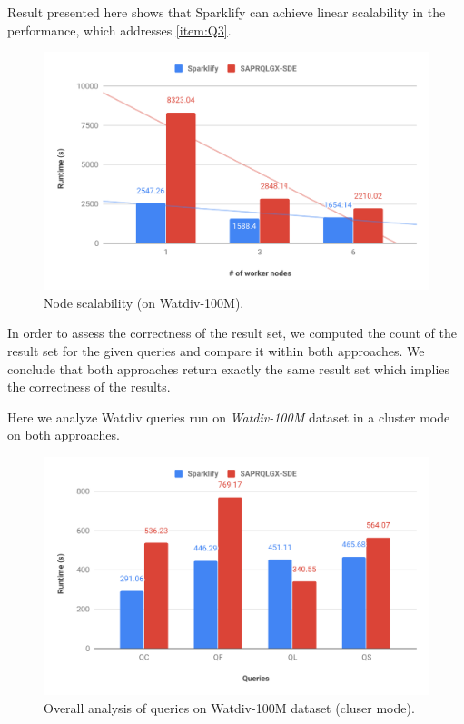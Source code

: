 Result presented here shows that Sparklify can achieve linear scalability in the performance, which addresses \ref{item:Q3}.

\begin{figure}
  \includegraphics[width=1.0\columnwidth]{images/node-scalability.pdf}
    \caption{Node scalability (on Watdiv-100M).}
    \label{fig:node-scalability}
\end{figure}

In order to assess the correctness of the result set, we computed the count of the result set for the given queries and compare it within both approaches.
We conclude that both approaches return exactly the same result set which implies the correctness of the results.


Here we analyze Watdiv queries run on \textit{Watdiv-100M} dataset in a cluster mode on both approaches.

\begin{figure}
  \includegraphics[width=1.0\columnwidth]{images/overall-analysis.pdf}
    \caption{Overall analysis of queries on Watdiv-100M dataset (cluser mode).}
    \label{fig:overall-analysis}
\end{figure}

